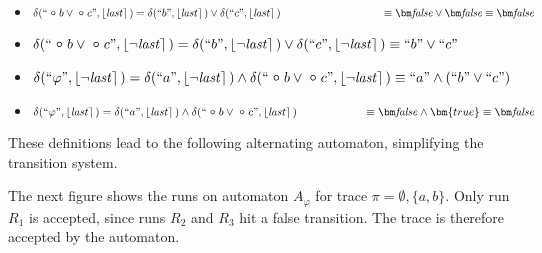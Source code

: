 \begin{example}
    \begin{itemize}
        
        \small
        \item $\delta(``\Next b \vee \Next c",\interp{\last})= \delta(``b",\interp{\last}) \vee \delta(``c",\interp{\last})\\
        \phantom{\delta(``\Next b \vee \Next c",\interp{\last})} \equiv \fpbf \vee \fpbf \equiv \fpbf$

        \item $\delta(``\Next b \vee \Next c",\interp{\neg \last})= \delta(``b",\interp{\neg \last}) \vee \delta(``c",\interp{\neg \last}) \equiv ``b" \vee ``c"$
        
        \item $\delta(``\varphi",\interp{\neg \last})= \delta(``a",\interp{\neg \last}) \wedge \delta(``\Next b \vee \Next c",\interp{\neg \last}) \equiv ``a" \wedge (``b" \vee ``c")$
        
        \item $\delta(``\varphi",\interp{\last})= \delta(``a",\interp{\last}) \wedge \delta(``\Next b \vee \Next c",\interp{\last})\\
        \phantom{\delta(``\varphi",\interp{\last})} \equiv \fpbf \wedge \bm{true} \equiv \fpbf$
    \end{itemize}

    These definitions lead to the following alternating automaton, simplifying the transition system.

    


    The next figure shows the runs on automaton $A_{\varphi}$ for trace $\pi=\emptyset,\{a,b\}$. Only run $R_1$ is accepted, since runs $R_2$ and $R_3$ hit a false transition. The trace is therefore accepted by the automaton. 

    
    

\end{example}


